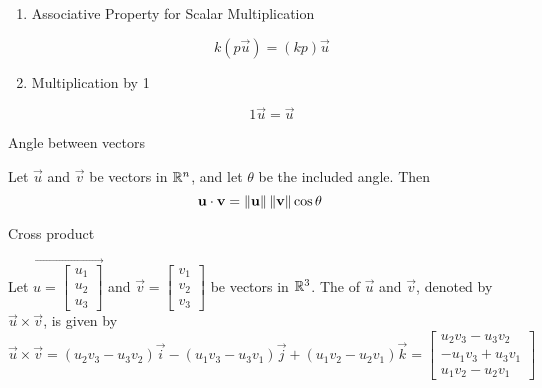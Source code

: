 \documentclass{ximera}
\begin{document}
\begin{enumerate}
  \item 
  Associative Property for Scalar Multiplication
  \begin{expandable}
  $$k(p\vec{u})=(kp)\vec{u}$$
  \end{expandable}

  \item 
  Multiplication by 1
  \begin{expandable}
  $$1\vec{u}=\vec{u}$$
  \end{expandable}
  \end{enumerate}


Angle between vectors

\begin{expandable}
     Let $\vec{u}$ and $\vec{v}$ be vectors in $\mathbb{R}^n$, and let $\theta$ be the included angle.  Then
  $$\mathbf{u}\cdot\mathbf{v}=\left\lVert\mathbf{u}\right\rVert\left\lVert\mathbf{v}\right\rVert\cos \theta$$
\end{expandable}

 
Cross product

\begin{expandable}
    Let $\vec{u=\begin{bmatrix}u_1\\u_2\\u_3\end{bmatrix}}$ and $\vec{v}=\begin{bmatrix}v_1\\v_2\\v_3\end{bmatrix}$ be vectors in $\mathbb{R}^3$.  The  of $\vec{u}$ and $\vec{v}$, denoted by $\vec{u}\times\vec{v}$, is given by
$$
\vec{u}\times\vec{v}=(u_2v_3-u_3v_2)\vec{i}-(u_1v_3-u_3v_1)\vec{j}+(u_1v_2-u_2v_1)\vec{k}=\begin{bmatrix}u_2v_3-u_3v_2\\-u_1v_3+u_3v_1\\u_1v_2-u_2v_1\end{bmatrix}
$$
\end{expandable}
\end{document}
